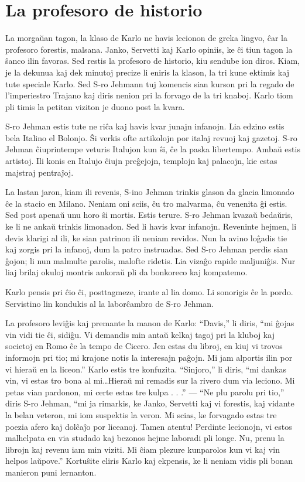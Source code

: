 \chapter{La profesoro de historio}

La morgaŭan tagon, la klaso de Karlo ne havis lecionon de greka lingvo, ĉar la profesoro forestis, malsana. Janko, Servetti kaj Karlo opiniis, ke ĉi tiun tagon la ŝanco ilin favoras. Sed restis la profesoro de historio, kiu sendube ion diros. Kiam, je la dekunua kaj dek minutoj precize li eniris la klason, la tri kune ektimis kaj tute speciale Karlo. Sed S-ro Jehmann tuj komencis sian kurson pri la regado de l'imperiestro Trajano kaj diris nenion pri la forvago de la tri knaboj. Karlo tiom pli timis la petitan viziton je duono post la kvara.

S-ro Jehman estis tute ne riĉa kaj havis kvar junajn infanojn. Lia edzino estis bela Italino el Bolonjo. Ŝi verkis ofte artikolojn por italaj revuoj kaj gazetoj. S-ro Jehman ĉiuprintempe veturis Italujon kun ŝi, ĉe la paska libertempo. Ambaŭ estis artistoj. Ili konis en Italujo ĉiujn preĝejojn, templojn kaj palacojn, kie estas majstraj pentraĵoj.

La lastan jaron, kiam ili revenis, S-ino Jehman trinkis glason da glacia limonado ĉe la stacio en Milano. Neniam oni sciis, ĉu tro malvarma, ĉu venenita ĝi estis. Sed post apenaŭ unu horo ŝi mortis. Estis terure. S-ro Jehman kvazaŭ bedaŭris, ke li ne ankaŭ trinkis limonadon. Sed li havis kvar infanojn. Reveninte hejmen, li devis klarigi al ili, ke sian patrinon ili neniam revidos. Nun la avino loĝadis tie kaj zorgis pri la infanoj, dum la patro instruadas. Sed S-ro Jehman perdis sian ĝojon; li nun malmulte parolis, malofte ridetis. Lia vizaĝo rapide maljuniĝis. Nur liaj brilaj okuloj montris ankoraŭ pli da bonkoreco kaj kompatemo.

Karlo pensis pri ĉio ĉi, posttagmeze, irante al lia domo. Li sonorigis ĉe la pordo. Servistino lin kondukis al la laborĉambro de S-ro Jehman.

La profesoro leviĝis kaj premante la manon de Karlo: ``Davis,'' li diris, ``mi ĝojas vin vidi tie ĉi, sidiĝu. Vi demandis min antaŭ kelkaj tagoj pri la kluboj kaj societoj en Romo ĉe la tempo de Cicero. Jen estas du libroj, en kiuj vi trovos informojn pri tio; mi krajone notis la interesajn paĝojn. Mi jam alportis ilin por vi hieraŭ en la liceon.'' Karlo estis tre konfuzita. ``Sinjoro,'' li diris, ``mi dankas vin, vi estas tro bona al mi\ldots{}Hieraŭ mi remadis sur la rivero dum via leciono. Mi petas vian pardonon, mi certe estas tre kulpa . . .'' — ``Ne plu parolu pri tio,'' diris S-ro Jehman, ``mi ja rimarkis, ke Janko, Servetti kaj vi forestis, kaj vidante la belan veteron, mi iom suspektis la veron. Mi scias, ke forvagado estas tre poezia afero kaj dolĉaĵo por liceanoj. Tamen atentu! Perdinte lecionojn, vi estos malhelpata en via studado kaj bezonos hejme laboradi pli longe. Nu, prenu la librojn kaj revenu iam min viziti. Mi ĉiam plezure kunparolos kun vi kaj vin helpos laŭpove.'' Kortuŝite eliris Karlo kaj ekpensis, ke li neniam vidis pli bonan manieron puni lernanton.

